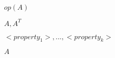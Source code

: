 \documentclass{article}
\begin{document}
$op(A)$
\pagebreak

${A, A^T}$
\pagebreak

$<property_1>, ..., <property_k>$
\pagebreak

$A$
\pagebreak
\end{document}
